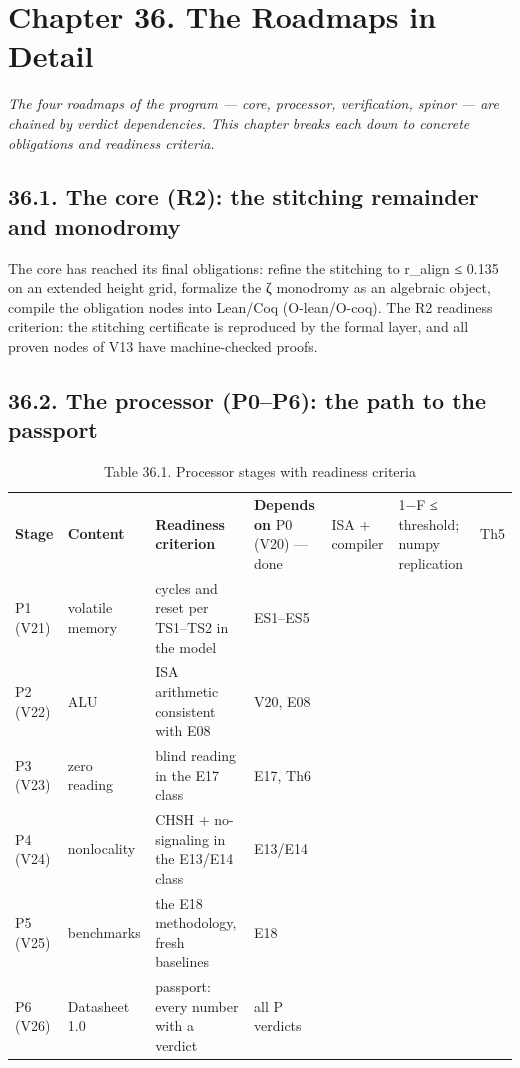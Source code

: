 \documentclass[11pt,a4paper]{article}
\begin{document}
\section{Chapter 36. The Roadmaps in Detail}

\noindent\textit{\color{copper}The four roadmaps of the program — core, processor, verification, spinor — are chained by verdict dependencies. This chapter breaks each down to concrete obligations and readiness criteria.}

\subsection{36.1. The core (R2): the stitching remainder and monodromy}

The core has reached its final obligations: refine the stitching to r\_align ≤ 0.135 on an extended height grid, formalize the ζ monodromy as an algebraic object, compile the obligation nodes into Lean/Coq (O-lean/O-coq). The R2 readiness criterion: the stitching certificate is reproduced by the formal layer, and all proven nodes of V13 have machine-checked proofs.

\subsection{36.2. The processor (P0–P6): the path to the passport}

\begin{table}[htbp]\centering\small
\caption{Table 36.1. Processor stages with readiness criteria}
\begin{tabular}{p{} p{} p{} p{}}
\toprule
\textbf{Stage} & \textbf{Content} & \textbf{Readiness criterion} & \textbf{Depends on}
\midrule
P0 (V20) — done & ISA + compiler & 1−F ≤ threshold; numpy replication & Th5 \\
P1 (V21) & volatile memory & cycles and reset per TS1–TS2 in the model & ES1–ES5 \\
P2 (V22) & ALU & ISA arithmetic consistent with E08 & V20, E08 \\
P3 (V23) & zero reading & blind reading in the E17 class & E17, Th6 \\
P4 (V24) & nonlocality & CHSH + no-signaling in the E13/E14 class & E13/E14 \\
P5 (V25) & benchmarks & the E18 methodology, fresh baselines & E18 \\
P6 (V26) & Datasheet 1.0 & passport: every number with a verdict & all P verdicts \\
\bottomrule
\end{tabular}
\end{table}
\end{document}
